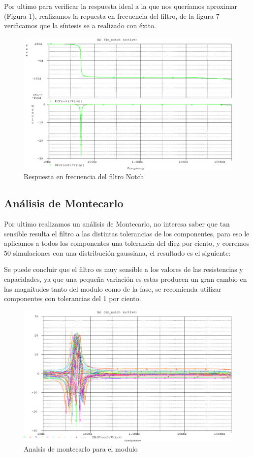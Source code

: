 \documentclass[12pt]{article}
\begin{document}
	Por ultimo para verificar la respuesta ideal a la que nos queríamos aproximar (Figura 1), realizamos la repuesta en frecuencia del filtro, de la figura 7 verificamos que la síntesis se a realizado con éxito.
	\begin{figure}[h!]
		\includegraphics[width=1\linewidth]{Imagenes/Bode_Notch}
		\caption[Respuesta en frecuencia del filtro Notch]{Respuesta en frecuencia del filtro Notch}
		\label{fig:bodenotch}
	\end{figure}
	
	\subsection{Análisis de Montecarlo}
	Por ultimo realizamos un análisis de Montecarlo, no interesa saber que tan sensible resulta el filtro a las distintas tolerancias de los componentes, para eso le aplicamos a todos los componentes una tolerancia del diez por ciento, y corremos 50 simulaciones con una distribución gaussiana, el resultado es el siguiente:
	
	Se puede concluir que el filtro es muy sensible a los valores de las resistencias y capacidades, ya que una pequeña variación es estas producen un gran cambio en las magnitudes tanto del modulo como de la fase, se recomienda utilizar componentes con tolerancias del 1 por ciento.
	\begin{figure}
		\includegraphics[width=1\linewidth]{Imagenes/montecarlo_modulo}
		\caption[Analsis de montecarlo para el modulo]{Analsis de montecarlo para el modulo}
		\label{fig:montecarlomodulo}
	\end{figure}
	
\end{document}
